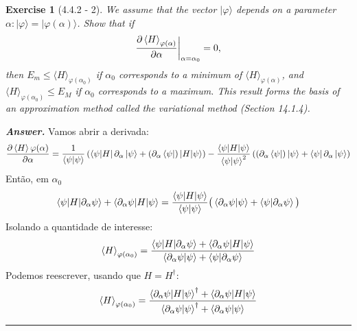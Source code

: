 \documentclass[12pt]{article}
\def\be{\begin{equation}}
\def\ee{\end{equation}}
\def\f{\frac}
\def\l{\left}
\def\r{\right}
\newtheorem{exercise}{Exercise}
\newenvironment{answer}{\noindent\textbf{\textit{Answer.}} \normalfont }{\par\noindent\rule{\textwidth}{0.4pt}}
\begin{document}
	\begin{exercise}[4.4.2 - 2]
		We assume that the vector $|\varphi\rangle$ depends on a parameter $\alpha:|\varphi\rangle=|\varphi(\alpha)\rangle$. Show that if
		\begin{equation}
			\frac{\partial\braket{H}_{\varphi(\alpha)}}{\partial \alpha}\bigg|_{\alpha=\alpha_0}=0,
		\end{equation}
		then $E_{m} \leq\langle H\rangle_{\varphi\left(\alpha_{0}\right)}$ if $\alpha_{0}$ corresponds to a minimum of $\langle H\rangle_{\varphi(\alpha)}$, and $\langle H\rangle_{\varphi\left(\alpha_{0}\right)} \leq E_{M}$ if $\alpha_{0}$ corresponds to a maximum. This result forms the basis of an approximation method called the variational method (Section 14.1.4).
	\end{exercise}
	\begin{answer}
		Vamos abrir a derivada:
		\be
			\frac{\partial\braket{H}{\varphi(\alpha)}}{\partial \alpha} = \f{1}{\braket{\psi|\psi}}\l( \bra{\psi|H} \partial_\alpha\ket{\psi} + (\partial_\alpha\bra{\psi})\ket{H|\psi}\r) - \f{\braket{\psi|H|\psi}}{\braket{\psi|\psi}^2}\l( (\partial_\alpha\bra{\psi})\ket{\psi} + \bra{\psi}\partial_\alpha\ket{\psi}\r) 
		\ee
		Então, em $\alpha_0$
		\be
			\braket{\psi|H|\partial_\alpha\psi} + \braket{\partial_\alpha\psi|H|\psi} = \f{\braket{\psi|H|\psi}}{\braket{\psi|\psi}}\big( \braket{\partial_\alpha\psi|\psi} + \braket{\psi|\partial_\alpha\psi}\big)
		\ee
		Isolando a quantidade de interesse:
		\be
			\braket{H}_{\varphi(\alpha_0)} = \f{\braket{\psi|H|\partial_\alpha\psi} + \braket{\partial_\alpha\psi|H|\psi}}{\braket{\partial_\alpha\psi|\psi} + \braket{\psi|\partial_\alpha\psi}}
		\ee 
		Podemos reescrever, usando que $H=H^\dagger$:
		\be
			\braket{H}_{\varphi(\alpha_0)} = \f{\braket{\partial_\alpha\psi|H|\psi}^\dagger + \braket{\partial_\alpha\psi|H|\psi}}{\braket{\partial_\alpha\psi|\psi}^\dagger + \braket{\partial_\alpha\psi|\psi}}
		\ee
		

\end{answer}
\end{document}
